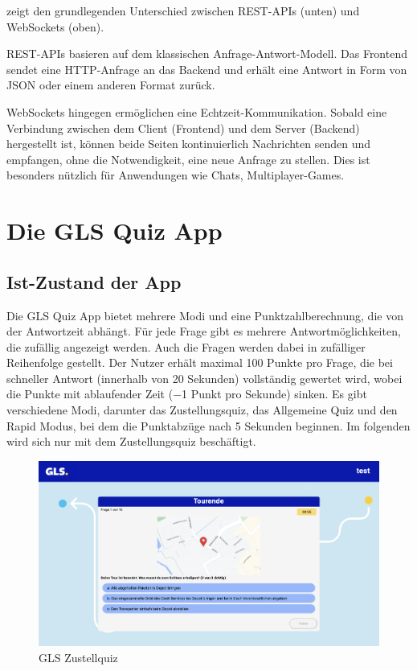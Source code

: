 \documentclass[biblatex]{lni}
\begin{document}
 zeigt den grundlegenden Unterschied zwischen REST-APIs (unten) und WebSockets (oben).

REST-APIs basieren auf dem klassischen Anfrage-Antwort-Modell.
Das Frontend sendet eine HTTP-Anfrage an das Backend und erhält eine Antwort in Form von JSON oder einem anderen Format zurück.

WebSockets hingegen ermöglichen eine Echtzeit-Kommunikation.
Sobald eine Verbindung zwischen dem Client (Frontend) und dem Server (Backend) hergestellt ist,
können beide Seiten kontinuierlich Nachrichten senden und empfangen, ohne die Notwendigkeit, eine neue Anfrage zu stellen.
Dies ist besonders nützlich für Anwendungen wie Chats, Multiplayer-Games.

\section{Die GLS Quiz App}
\subsection{Ist-Zustand der App}

Die GLS Quiz App bietet mehrere Modi und eine Punktzahlberechnung,
die von der Antwortzeit abhängt.
Für jede Frage gibt es mehrere Antwortmöglichkeiten,
die zufällig angezeigt werden.
Auch die Fragen werden dabei in zufälliger Reihenfolge gestellt.
Der Nutzer erhält maximal 100 Punkte pro Frage,
die bei schneller Antwort (innerhalb von 20 Sekunden) vollständig gewertet wird,
wobei die Punkte mit ablaufender Zeit (−1 Punkt pro Sekunde) sinken.
Es gibt verschiedene Modi, darunter das Zustellungsquiz,
das Allgemeine Quiz und den Rapid Modus, bei dem die Punktabzüge nach 5 Sekunden beginnen.
Im folgenden wird sich nur mit dem Zustellungsquiz beschäftigt.

\begin{figure}
  \centering
  \includegraphics[width=.8\textwidth]{gls-trainee}
  \caption{GLS Zustellquiz}
  \label{fig:gls-trainee}
\end{figure}
\end{document}
